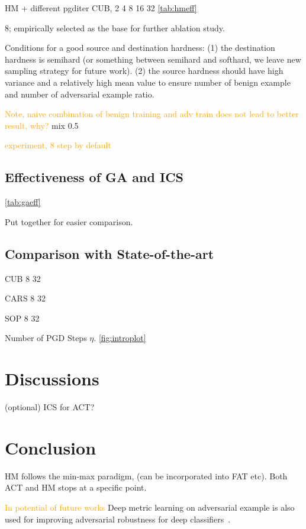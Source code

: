 \documentclass[10pt,twocolumn,letterpaper]{article}
\newcommand{\oo}[1]{\textcolor{orange}{#1}}
\begin{document}
HM + different pgditer
CUB, 2 4 8 16 32
\cref{tab:hmeff}

8; empirically selected as the base for further ablation study.

Conditions for a good source and destination hardness:
%
(1) the destination hardness is semihard (or something between semihard
and softhard, we leave new sampling strategy for future work).
(2) the source hardness should have high variance and a relatively high mean
value to ensure number of benign example and number of adversarial example ratio.

\oo{Note, naive combination of benign training and adv train does not lead to better
result, why?} mix 0.5

\oo{experiment, 8 step by default}

\subsection{Effectiveness of GA and ICS}
\label{sec:43}



\cref{tab:gaeff}

Put together for easier comparison.

\subsection{Comparison with State-of-the-art}

CUB 8 32

CARS 8 32

SOP 8 32

Number of PGD Steps $\eta$.
\cref{fig:introplot}

\section{Discussions}
\label{sec:5}

(optional) ICS for ACT?

\section{Conclusion}
\label{sec:6}

HM follows the min-max paradigm, (can be incorporated into FAT etc).
Both ACT and HM stops at a specific point.

\oo{In potential of future works}
Deep metric learning on adversarial example is also used for improving
adversarial robustness for deep classifiers~\cite{mao2019metric}.

{\small


}


\end{document}
